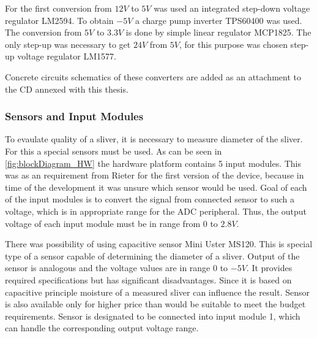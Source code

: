 \documentclass[twoside]{ctuthesis}
\theoremstyle{plain}
\theoremstyle{definition}
\theoremstyle{note}
\begin{document}
For the first conversion from $12 V$ to $5 V$ was used an integrated step-down voltage regulator LM2594. To obtain $-5 V$ a charge pump inverter TPS60400 was used. The conversion from $5 V$ to $3.3 V$ is done by simple linear regulator MCP1825. The only step-up was necessary to get $24 V$ from $5 V$, for this purpose was chosen step-up voltage regulator LM1577.

Concrete circuits schematics of these converters are added as an attachment to the CD annexed with this thesis.

\subsubsection{Sensors and Input Modules}
\label{sec:Sensors}
To evaulate quality of a sliver, it is necessary to measure diameter of the sliver. For this a special sensors must be used. 
As can be seen in \ref{fig:blockDiagram_HW} the hardware platform contains 5 input modules. This was as an requirement from Rieter for the first version of the device, because in time of the development it was unsure which sensor would be used. Goal of each of the input modules is to convert the signal from connected sensor to such a voltage, which is in appropriate range for the ADC peripheral. Thus, the output voltage of each input module must be in range from $0$ to $2.8V$.

There was possibility of using capacitive sensor Mini Uster MS120. This is special type of a sensor capable of determining the diameter of a sliver. Output of the sensor is analogous and the voltage values are in range $0$ to $-5V$. It provides required specifications but has significant disadvantages. Since it is based on capacitive principle moisture of a measured sliver can influence the result. Sensor is also available only for higher price than would be suitable to meet the budget requirements. Sensor is designated to be connected into input module 1, which can handle the corresponding output voltage range.
\end{document}
